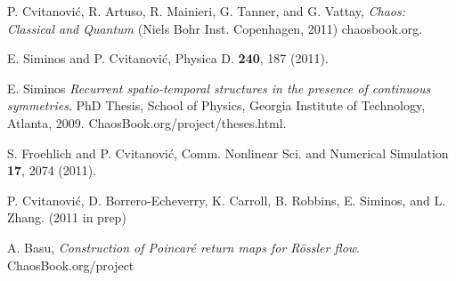 \documentclass[aip,cha,reprint,
secnumarabic,
nofootinbib, tightenlines,
nobibnotes, showkeys, showpacs,
groupedaddress
]{revtex4-1}
\begin{document}
\begin{thebibliography}{9}

 P. Cvitanovi\'c, R. Artuso, R. Mainieri, G. Tanner, and G. Vattay, \emph{Chaos: Classical and Quantum} (Niels Bohr Inst. Copenhagen, 2011)
    chaosbook.org.

 E. Siminos and P. Cvitanovi\'c, Physica D. {\bf 240}, 187 (2011).

 E. Siminos \emph{Recurrent spatio-temporal structures in the presence of continuous symmetries}. PhD Thesis, School of Physics, Georgia Institute of Technology, Atlanta, 2009.
    ChaosBook.org/project/theses.html.

 S. Froehlich and P. Cvitanovi\'c, Comm. Nonlinear Sci. and Numerical Simulation {\bf 17}, 2074 (2011).

 P. Cvitanovi\'c, D. Borrero-Echeverry, K. Carroll, B. Robbins, E. Siminos, and L. Zhang. (2011 in prep)

 A. Basu, \emph{Construction of Poincar\'e return maps for R\"ossler flow}.
    ChaosBook.org/project


\end{thebibliography}
\end{document}
